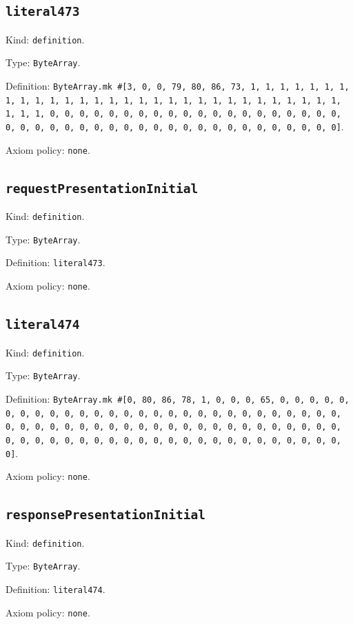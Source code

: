 \documentclass[11pt]{article}
\begin{document}
\subsection*{\texttt{literal473}}
\noindent Kind: \texttt{definition}.\par
\noindent Type: \texttt{ByteArray}.\par
\noindent Definition: \texttt{ByteArray.mk \#[3, 0, 0, 79, 80, 86, 73, 1, 1, 1, 1, 1, 1, 1, 1, 1, 1, 1, 1, 1, 1, 1, 1, 1, 1, 1, 1, 1, 1, 1, 1, 1, 1, 1, 1, 1, 1, 1, 1, 1, 0, 0, 0, 0, 0, 0, 0, 0, 0, 0, 0, 0, 0, 0, 0, 0, 0, 0, 0, 0, 0, 0, 0, 0, 0, 0, 0, 0, 0, 0, 0, 0, 0, 0, 0, 0, 0, 0, 0, 0, 0, 0, 0]}.\par
\noindent Axiom policy: \texttt{none}.\par
\subsection*{\texttt{requestPresentationInitial}}
\noindent Kind: \texttt{definition}.\par
\noindent Type: \texttt{ByteArray}.\par
\noindent Definition: \texttt{literal473}.\par
\noindent Axiom policy: \texttt{none}.\par
\subsection*{\texttt{literal474}}
\noindent Kind: \texttt{definition}.\par
\noindent Type: \texttt{ByteArray}.\par
\noindent Definition: \texttt{ByteArray.mk \#[0, 80, 86, 78, 1, 0, 0, 0, 65, 0, 0, 0, 0, 0, 0, 0, 0, 0, 0, 0, 0, 0, 0, 0, 0, 0, 0, 0, 0, 0, 0, 0, 0, 0, 0, 0, 0, 0, 0, 0, 0, 0, 0, 0, 0, 0, 0, 0, 0, 0, 0, 0, 0, 0, 0, 0, 0, 0, 0, 0, 0, 0, 0, 0, 0, 0, 0, 0, 0, 0, 0, 0, 0, 0, 0, 0, 0, 0, 0, 0, 0, 0, 0, 0]}.\par
\noindent Axiom policy: \texttt{none}.\par
\subsection*{\texttt{responsePresentationInitial}}
\noindent Kind: \texttt{definition}.\par
\noindent Type: \texttt{ByteArray}.\par
\noindent Definition: \texttt{literal474}.\par
\noindent Axiom policy: \texttt{none}.\par
\end{document}

